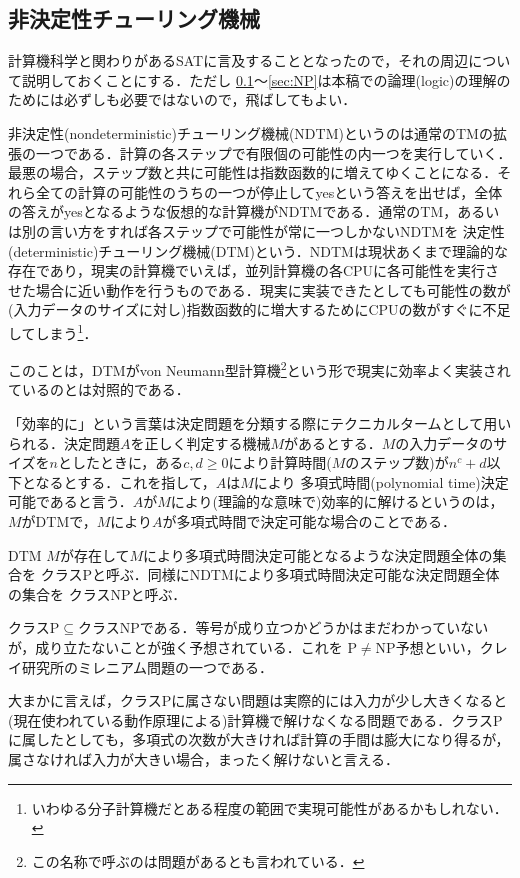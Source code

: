 \documentclass{ltjsarticle}
\theoremstyle{mystyle1}
\theoremstyle{mystyle2}
\newcommand{\red}[1]{{\color{red} #1}}
\begin{document}
\subsection{非決定性チューリング機械}\label{sec:NDTM}
計算機科学と関わりがあるSATに言及することとなったので，それの周辺について説明しておくことにする．ただし \ref{sec:NDTM}～\ref{sec:NP}は本稿での論理(logic)の理解のためには必ずしも必要ではないので，飛ばしてもよい．

\red{非決定性}(nondeterministic)チューリング機械(NDTM)というのは通常のTMの拡張の一つである．計算の各ステップで有限個の可能性の内一つを実行していく．最悪の場合，ステップ数と共に可能性は指数函数的に増えてゆくことになる．それら全ての計算の可能性のうちの一つが停止してyesという答えを出せば，全体の答えがyesとなるような仮想的な計算機がNDTMである．通常のTM，あるいは別の言い方をすれば各ステップで可能性が常に一つしかないNDTMを\red{決定性}(deterministic)チューリング機械(DTM)という．NDTMは現状あくまで理論的な存在であり，現実の計算機でいえば，並列計算機の各CPUに各可能性を実行させた場合に近い動作を行うものである．現実に実装できたとしても可能性の数が(入力データのサイズに対し)指数函数的に増大するためにCPUの数がすぐに不足してしまう\footnote{いわゆる分子計算機だとある程度の範囲で実現可能性があるかもしれない．}．

このことは，DTMがvon Neumann型計算機\footnote{この名称で呼ぶのは問題があるとも言われている．}という形で現実に効率よく実装されているのとは対照的である．

「効率的に」という言葉は決定問題を分類する際にテクニカルタームとして用いられる．決定問題$A$を正しく判定する機械$M$があるとする．$M$の入力データのサイズを$n$としたときに，ある$c,d\geq 0$により計算時間($M$のステップ数)が$n^c + d$以下となるとする．これを指して，$A$は$M$により\red{多項式時間}(polynomial time)決定可能であると言う．$A$が$M$により(理論的な意味で)効率的に解けるというのは，$M$がDTMで，$M$により$A$が多項式時間で決定可能な場合のことである．

DTM $M$が存在して$M$により多項式時間決定可能となるような決定問題全体の集合を\red{クラスP}と呼ぶ．同様にNDTMにより多項式時間決定可能な決定問題全体の集合を\red{クラスNP}と呼ぶ．

クラスP$\subseteq$クラスNPである．等号が成り立つかどうかはまだわかっていないが，成り立たないことが強く予想されている．これを\red{P$\neq$NP予想}といい，クレイ研究所のミレニアム問題の一つである．

大まかに言えば，クラスPに属さない問題は実際的には入力が少し大きくなると(現在使われている動作原理による)計算機で解けなくなる問題である．クラスPに属したとしても，多項式の次数が大きければ計算の手間は膨大になり得るが，属さなければ入力が大きい場合，まったく解けないと言える．
\end{document}
